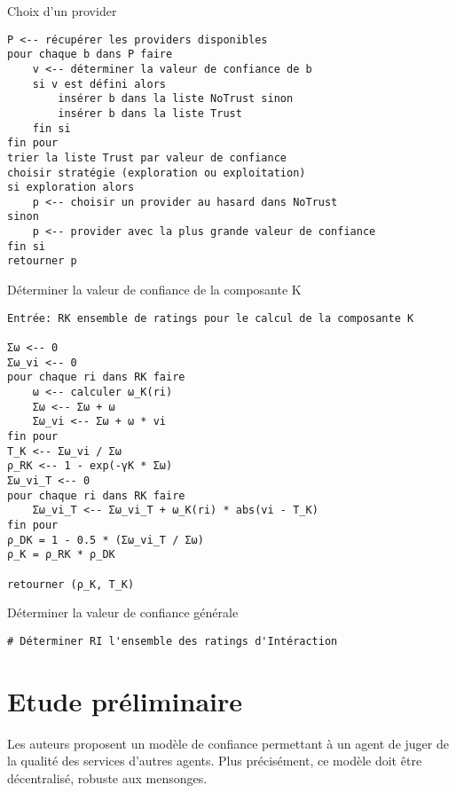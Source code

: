 \documentclass{article}
\begin{document}
\begin{pseudocode}{Choix d'un provider}
\begin{verbatim}
P <-- récupérer les providers disponibles
pour chaque b dans P faire
    v <-- déterminer la valeur de confiance de b
    si v est défini alors
        insérer b dans la liste NoTrust sinon
        insérer b dans la liste Trust
    fin si
fin pour
trier la liste Trust par valeur de confiance
choisir stratégie (exploration ou exploitation)
si exploration alors
    p <-- choisir un provider au hasard dans NoTrust
sinon
    p <-- provider avec la plus grande valeur de confiance
fin si
retourner p
\end{verbatim}
\end{pseudocode}

\begin{pseudocode}{Déterminer la valeur de confiance de la composante K}
\begin{verbatim}
Entrée: RK ensemble de ratings pour le calcul de la composante K

Σω <-- 0
Σω_vi <-- 0
pour chaque ri dans RK faire
    ω <-- calculer ω_K(ri)
    Σω <-- Σω + ω
    Σω_vi <-- Σω + ω * vi
fin pour
T_K <-- Σω_vi / Σω
ρ_RK <-- 1 - exp(-γK * Σω)
Σω_vi_T <-- 0
pour chaque ri dans RK faire
    Σω_vi_T <-- Σω_vi_T + ω_K(ri) * abs(vi - T_K)
fin pour
ρ_DK = 1 - 0.5 * (Σω_vi_T / Σω)
ρ_K = ρ_RK * ρ_DK

retourner (ρ_K, T_K)
\end{verbatim}
\end{pseudocode}

\begin{pseudocode}{Déterminer la valeur de confiance générale}
\begin{verbatim}
# Déterminer RI l'ensemble des ratings d'Intéraction
\end{verbatim}
\end{pseudocode}



\section{Etude préliminaire}
\label{sec:etude-preliminaire}


Les auteurs proposent un modèle de confiance permettant à un agent de juger de la qualité des services d'autres agents. Plus précisément, ce modèle doit être décentralisé, robuste aux mensonges.
\end{document}
